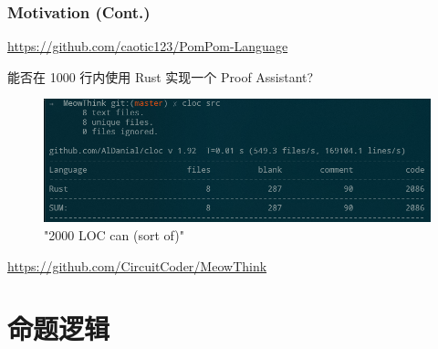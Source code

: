 \documentclass[UTF-8]{ctexbeamer}
\begin{document}
\begin{frame}
  \frametitle{Motivation (Cont.)}

  \url{https://github.com/caotic123/PomPom-Language}
  
  \pause

  \vspace{1em}

  能否在 1000 行内使用 Rust 实现一个 Proof Assistant?

  \pause

  \begin{figure}
    \includegraphics[width=\textwidth]{assets/cloc.png}
    \caption{"2000 LOC can (sort of)"}
  \end{figure}

  \url{https://github.com/CircuitCoder/MeowThink}

\end{frame}

\section{命题逻辑}
\end{document}
